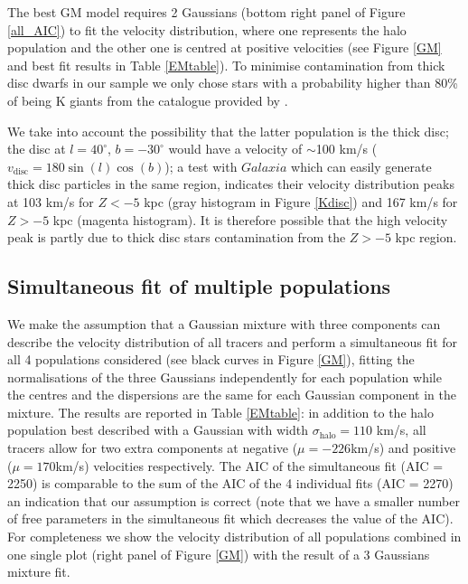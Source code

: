 \documentclass[useAMS,usenatbib]{mn2e}
\begin{document}
The best GM model requires 2 Gaussians (bottom right panel of Figure \ref{all_AIC}) to fit the velocity distribution, where one represents the halo population and the  other  one is centred at positive velocities (see Figure \ref{GM} and best fit results in Table \ref{EMtable}). To minimise contamination from thick disc dwarfs in our sample we only chose stars with a probability higher than 80\% of being  K giants from the catalogue provided by \citet{Xu14}. 

We take into account the possibility that the latter population is the thick disc; the disc at $l = 40^{\circ}$, $b = -30^{\circ}$ would have a velocity of $\sim$100 km/s ($v_{\mathrm{disc}} =180\sin(l)\cos(b)$); a test with $Galaxia$ \citep{Sh11} which can easily generate thick disc particles in the same region, indicates their velocity distribution peaks at 103 km/s for $Z < -5$ kpc (gray histogram in Figure \ref{Kdisc}) and 167 km/s for $Z > -5$ kpc (magenta histogram). It is therefore possible that the high velocity peak is partly due to thick disc stars contamination from the $Z > -5$ kpc region.
%
\subsection{Simultaneous fit of multiple populations}
We make the assumption that a Gaussian mixture with three components can describe the velocity distribution of all tracers and perform a simultaneous fit for all 4 populations considered (see black curves in Figure \ref{GM}), fitting the normalisations of the three Gaussians independently for each population while the centres and the dispersions are the same for each Gaussian component in the mixture. The results are reported in Table \ref{EMtable}: in addition to the halo population best described with a Gaussian with width $\sigma_{\mathrm{halo}} = 110$ km/s, all tracers allow for two extra components at negative ($\mu = -226$km/s) and positive ($\mu=170$km/s) velocities respectively. The AIC of the simultaneous fit  (AIC = 2250) is comparable to the sum of the AIC of the 4 individual fits (AIC = 2270) an indication that our assumption is correct (note that we have a smaller number of free parameters in the simultaneous fit which decreases the value of the AIC). For completeness we show the velocity distribution of all populations combined in one single plot (right panel of Figure \ref{GM}) with the result of a 3 Gaussians mixture fit.  
\end{document}
